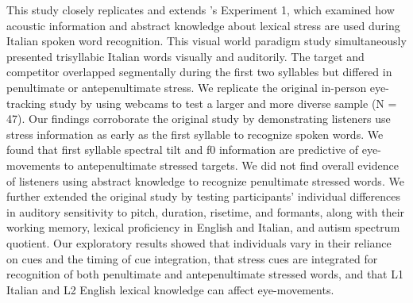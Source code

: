 This study closely replicates and extends \cite{Sulpizio_McQueen_2012}'s Experiment 1, which examined how acoustic information and abstract knowledge about lexical stress are used during Italian spoken word recognition. This visual world paradigm study simultaneously presented trisyllabic Italian words visually and auditorily. The target and competitor overlapped segmentally during the first two syllables but differed in penultimate or antepenultimate stress. We replicate the original in-person eye-tracking study by using webcams to test a larger and more diverse sample (N = 47). Our findings corroborate the original study by demonstrating listeners use stress information as early as the first syllable to recognize spoken words. We found that first syllable spectral tilt and f0 information are predictive of eye-movements to antepenultimate stressed targets. We did not find overall evidence of listeners using abstract knowledge to recognize penultimate stressed words. We further extended the original study by testing participants' individual differences in auditory sensitivity to pitch, duration, risetime, and formants, along with their working memory, lexical proficiency in English and Italian, and autism spectrum quotient. Our exploratory results showed that individuals vary in their reliance on cues and the timing of cue integration, that stress cues are integrated for recognition of both penultimate and antepenultimate stressed words, and that L1 Italian and L2 English lexical knowledge can affect eye-movements. 